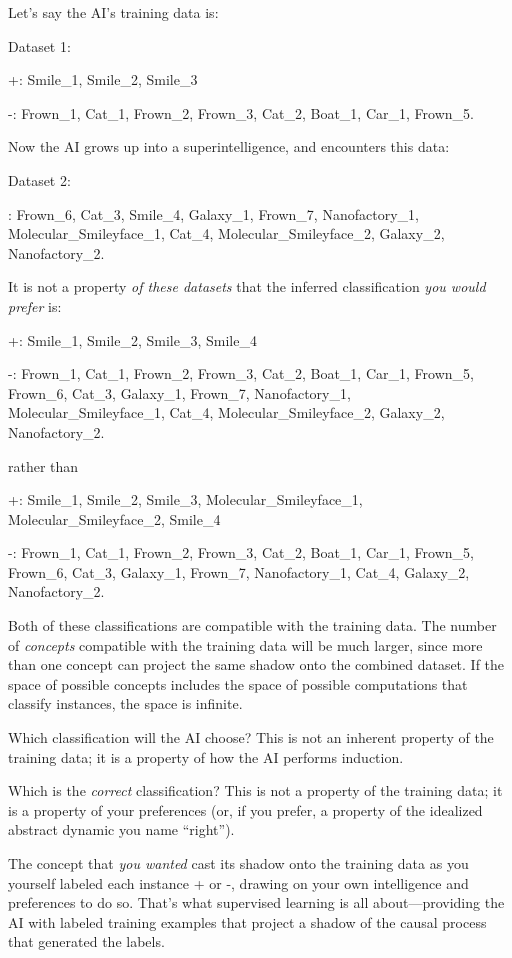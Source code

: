 {
 Let's say the AI's training data
is:}

{
 Dataset 1:}

{
 +: Smile\_1, Smile\_2, Smile\_3}

{
 {}-: Frown\_1, Cat\_1, Frown\_2, Frown\_3, Cat\_2, Boat\_1,
Car\_1, Frown\_5.}

{
 Now the AI grows up into a superintelligence, and encounters this
data:}

{
 Dataset 2:}

{
 : Frown\_6, Cat\_3, Smile\_4, Galaxy\_1, Frown\_7, Nanofactory\_1,
Molecular\_Smileyface\_1, Cat\_4, Molecular\_Smileyface\_2, Galaxy\_2,
Nanofactory\_2.}

{
 It is not a property \textit{of these datasets} that the inferred
classification \textit{you would prefer} is:}

{
 +: Smile\_1, Smile\_2, Smile\_3, Smile\_4}

{
 {}-: Frown\_1, Cat\_1, Frown\_2, Frown\_3, Cat\_2, Boat\_1,
Car\_1, Frown\_5, Frown\_6, Cat\_3, Galaxy\_1, Frown\_7,
Nanofactory\_1, Molecular\_Smileyface\_1, Cat\_4,
Molecular\_Smileyface\_2, Galaxy\_2, Nanofactory\_2.}

{
 rather than}

{
 +: Smile\_1, Smile\_2, Smile\_3, Molecular\_Smileyface\_1,
Molecular\_Smileyface\_2, Smile\_4}

{
 {}-: Frown\_1, Cat\_1, Frown\_2, Frown\_3, Cat\_2, Boat\_1,
Car\_1, Frown\_5, Frown\_6, Cat\_3, Galaxy\_1, Frown\_7,
Nanofactory\_1, Cat\_4, Galaxy\_2, Nanofactory\_2.}

{
 Both of these classifications are compatible with the training
data. The number of \textit{concepts} compatible with the training data
will be much larger, since more than one concept can project the same
shadow onto the combined dataset. If the space of possible concepts
includes the space of possible computations that classify instances,
the space is infinite.}

{
 Which classification will the AI choose? This is not an inherent
property of the training data; it is a property of how the AI performs
induction.}

{
 Which is the \textit{correct} classification? This is not a
property of the training data; it is a property of your preferences
(or, if you prefer, a property of the idealized abstract dynamic you
name ``right'').}

{
 The concept that \textit{you wanted} cast its shadow onto the
training data as you yourself labeled each instance + or -, drawing on
your own intelligence and preferences to do so. That's
what supervised learning is all about---providing the AI with labeled
training examples that project a shadow of the causal process that
generated the labels.}

